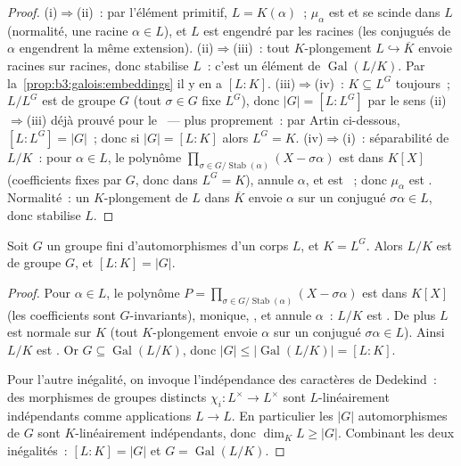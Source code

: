 \begin{proof}
(i)$\Rightarrow$(ii)~: par l'élément primitif, $L = K(\alpha)$~;
$\mu_\alpha$ est  et se scinde dans $L$ (normalité,
une racine $\alpha \in L$), et $L$ est engendré par les racines
(les conjugués de $\alpha$ engendrent la même extension).
(ii)$\Rightarrow$(iii)~: tout $K$-plongement $L \hookrightarrow
\overline K$ envoie racines sur racines, donc stabilise $L$~:
c'est un élément de $\operatorname{Gal}(L/K)$. Par
la~\cref{prop:b3:galois:embeddings} il y en a $[L:K]$.
(iii)$\Rightarrow$(iv)~: $K \subseteq L^G$ toujours~; $L/L^G$
est  de groupe $G$ (tout $\sigma \in G$ fixe $L^G$),
donc $|G| = [L:L^G]$ par le sens (ii)$\Rightarrow$(iii) déjà
prouvé pour le ~--- plus proprement~: par
Artin ci-dessous, $[L:L^G] = |G|$~; donc si $|G| = [L:K]$ alors
$L^G = K$.
(iv)$\Rightarrow$(i)~: séparabilité de $L/K$~: pour $\alpha \in
L$, le polynôme $\prod_{\sigma \in G/\operatorname{Stab}(\alpha)}
(X - \sigma\alpha)$ est dans $K[X]$ (coefficients fixes par $G$,
donc dans $L^G = K$), annule $\alpha$, et est ~; donc
$\mu_\alpha$ est . Normalité~: un $K$-plongement de $L$
dans $\overline K$ envoie $\alpha$ sur un conjugué $\sigma\alpha
\in L$, donc stabilise $L$.
\end{proof}

\begin{lemma}[Artin]\label{lem:b3:galois:artin}
Soit $G$ un groupe fini d'automorphismes d'un corps $L$, et $K =
L^G$. Alors $L/K$ est  de groupe $G$, et $[L:K] =
|G|$.
\end{lemma}

\begin{proof}
Pour $\alpha \in L$, le polynôme $P = \prod_{\sigma \in
G/\operatorname{Stab}(\alpha)}(X - \sigma\alpha)$ est dans $K[X]$
(les coefficients sont $G$-invariants), monique, , et
annule $\alpha$~: $L/K$ est  . De plus $L$ est
normale sur $K$ (tout $K$-plongement envoie $\alpha$ sur un
conjugué $\sigma\alpha \in L$). Ainsi $L/K$ est . Or
$G \subseteq \operatorname{Gal}(L/K)$, donc $|G| \leq
|\operatorname{Gal}(L/K)| = [L:K]$.

Pour l'autre inégalité, on invoque l'indépendance des caractères
de Dedekind~: des morphismes de groupes distincts $\chi_i \colon
L^\times \to L^\times$ sont $L$-linéairement indépendants comme
applications $L \to L$. En particulier les $|G|$
automorphismes de $G$ sont $K$-linéairement indépendants, donc
$\dim_K L \geq |G|$. Combinant les deux inégalités~: $[L:K] =
|G|$ et $G = \operatorname{Gal}(L/K)$.
\end{proof}

